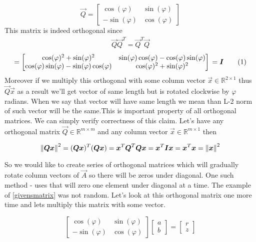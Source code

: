 \begin{equation} \label{givensmatrix}
\vec{Q} = 
\begin{bmatrix} 
\cos(\varphi) & \sin(\varphi) \\
- \sin(\varphi) & \cos(\varphi)
\end{bmatrix}
\end{equation}
This matrix is indeed orthogonal since 
\begin{align*} 
\vec{Q}\vec{Q}^T = \vec{Q}^T\vec{Q}    
\end{align*}
 \begin{equation*}
	= \begin{bmatrix} 
		\cos(\varphi)^2 + \sin(\varphi)^2  & \sin(\varphi)\cos(\varphi) - \cos(\varphi)\sin(\varphi) \\
		\cos(\varphi)\sin(\varphi) - \sin(\varphi)\cos(\varphi) & \cos(\varphi)^2 + \sin(\varphi)^2
	\end{bmatrix} \\ = \vec{I}
	\numberthis
\end{equation*}
Moreover if we multiply this orthogonal with some column vector $\vec{x} \in \mathbb{R}^{2 \times 1}$ thus $\vec{Q}\vec{x}$ as a result we'll get vector of same length but is rotated clockwise by  $\varphi$ radians. When we say that vector will have same length we mean than L-2 norm of such vector will be the same.This is important property of all orthogonal matrices. We can simply verify correctness of this claim. Let's have any orthogonal matrix $\vec{Q} \in \mathbb{R}^{m \times m}$ and any column vector $\vec{x} \in  \mathbb{R}^{m \times 1}$ then

\begin{equation}
	\left\lVert\boldsymbol{Q}\boldsymbol{x}\right\rVert^2 = (\boldsymbol{Q}\boldsymbol{x})^T (\boldsymbol{Q}\boldsymbol{x}) = \boldsymbol{x}^T\boldsymbol{Q}^T\boldsymbol{Q}\boldsymbol{x} = 
	\boldsymbol{x}^T\boldsymbol{I}\boldsymbol{x} = \boldsymbol{x}^T\boldsymbol{x} = \left\lVert\boldsymbol{x}\right\rVert^2
\end{equation}

So we would like to create series of orthogonal matrices which will gradually rotate column vectors of $\vec{A}$ so there will be zeros under diagonal. One such method -  uses  that will zero one element under diagonal at a time.
The example of \ref{givensmatrix} was not random. Let's look at this orthogonal matrix one more time and lets multiply this matrix with some vector.

\begin{equation}
	\begin{bmatrix} 
		\cos(\varphi) & \sin(\varphi) \\
		- \sin(\varphi) & \cos(\varphi)
		\end{bmatrix}
		\begin{bmatrix} 
			a \\
			b
			\end{bmatrix} = 
			\begin{bmatrix} 
				r \\
				z
				\end{bmatrix}
\end{equation}

